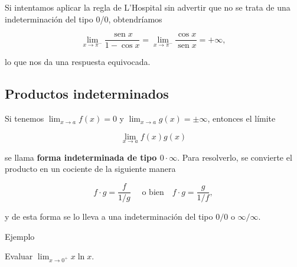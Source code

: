 \documentclass[
  letterpaper,
]{book}
\theoremstyle{plain}
\theoremstyle{remark}
\begin{document}
\begin{tcolorbox}[enhanced jigsaw, opacityback=0, left=2mm, opacitybacktitle=0.6, toprule=.15mm, bottomrule=.15mm, colbacktitle=quarto-callout-caution-color!10!white, titlerule=0mm, bottomtitle=1mm, title=\textcolor{quarto-callout-caution-color}{\faFire}\hspace{0.5em}{Importante}, toptitle=1mm, colframe=quarto-callout-caution-color-frame, colback=white, breakable, rightrule=.15mm, arc=.35mm, leftrule=.75mm, coltitle=black]

Si intentamos aplicar la regla de L'Hospital sin advertir que no se
trata de una indeterminación del tipo 0/0, obtendríamos

\[
\lim_{x\to \pi^-} \frac{\operatorname{sen} x}{1-\cos x}=\lim_{x\to \pi^-}\frac{\cos x}{\operatorname{sen} x}=+\infty,
\]

lo que nos da una respuesta equivocada.

\end{tcolorbox}

\subsection{Productos indeterminados}\label{productos-indeterminados}

Si tenemos \(\displaystyle \lim_{x\to a}f(x)=0\) y
\(\lim_{x\to a}g(x)=\pm \infty\), entonces el límite

\[
\lim_{x\to a}f(x)g(x)
\]

se llama \textbf{forma indeterminada de tipo \(0\cdot \infty\)}. Para
resolverlo, se convierte el producto en un cociente de la siguiente
manera

\[f\cdot g =\frac{f}{1/g}\quad \text{ o bien} \quad f\cdot g=\frac{g}{1/f},\]

y de esta forma se lo lleva a una indeterminación del tipo \(0/0\) o
\(\infty/\infty\).

Ejemplo

Evaluar \(\lim_{x\to 0^+}x\ln x\).
\end{document}
